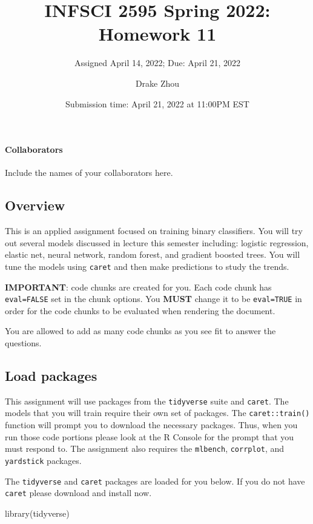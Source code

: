 \documentclass[
]{article}
\title{INFSCI 2595 Spring 2022: Homework 11}
\subtitle{Assigned April 14, 2022; Due: April 21, 2022}
\author{Drake Zhou}
\date{Submission time: April 21, 2022 at 11:00PM EST}
\newenvironment{Shaded}{\begin{snugshade}}{\end{snugshade}}
\newcommand{\FunctionTok}[1]{\textcolor[rgb]{0.00,0.00,0.00}{#1}}
\newcommand{\NormalTok}[1]{#1}
\begin{document}
\maketitle

\hypertarget{collaborators}{%
\paragraph{Collaborators}\label{collaborators}}

Include the names of your collaborators here.

\hypertarget{overview}{%
\subsection{Overview}\label{overview}}

This is an applied assignment focused on training binary classifiers.
You will try out several models discussed in lecture this semester
including: logistic regression, elastic net, neural network, random
forest, and gradient boosted trees. You will tune the models using
\texttt{caret} and then make predictions to study the trends.

\textbf{IMPORTANT}: code chunks are created for you. Each code chunk has
\texttt{eval=FALSE} set in the chunk options. You \textbf{MUST} change
it to be \texttt{eval=TRUE} in order for the code chunks to be evaluated
when rendering the document.

You are allowed to add as many code chunks as you see fit to answer the
questions.

\hypertarget{load-packages}{%
\subsection{Load packages}\label{load-packages}}

This assignment will use packages from the \texttt{tidyverse} suite and
\texttt{caret}. The models that you will train require their own set of
packages. The \texttt{caret::train()} function will prompt you to
download the necessary packages. Thus, when you run those code portions
please look at the R Console for the prompt that you must respond to.
The assignment also requires the \texttt{mlbench}, \texttt{corrplot},
and \texttt{yardstick} packages.

The \texttt{tidyverse} and \texttt{caret} packages are loaded for you
below. If you do not have \texttt{caret} please download and install
now.

\begin{Shaded}
\begin{Highlighting}[]
\FunctionTok{library}\NormalTok{(tidyverse)}
\end{Highlighting}
\end{Shaded}
\end{document}
